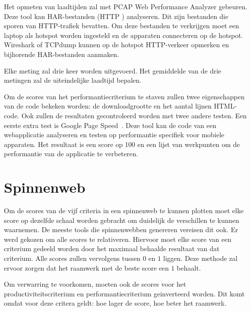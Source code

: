 
Het opmeten van laadtijden zal met PCAP Web Performance Analyzer gebeuren. %
Deze tool kan HAR-bestanden (HTTP ) analyseren.
Dit zijn bestanden die sporen van HTTP-trafiek bevatten.
Om deze bestanden te verkrijgen moet een laptop als hotspot worden ingesteld en de apparaten connecteren op de hotspot.
Wireshark of TCPdump kunnen op de hotspot HTTP-verkeer opmerken en bijhorende HAR-bestanden aanmaken.

Elke meting zal drie keer worden uitgevoerd.
Het gemiddelde van de drie metingen zal de uiteindelijke laadtijd bepalen.

Om de scores van het performantiecriterium te staven zullen twee eigenschappen van de code bekeken worden:  de downloadgrootte en het aantal lijnen HTML-code.
Ook zullen de resultaten gecontroleerd worden met twee andere testen.
Een eerste extra test is Google Page Speed~\cite{Morgan2011}. 
Deze tool kan de code van een webapplicatie analyseren en testen op performantie specifiek voor mobiele apparaten.
Het resultaat is een score op 100 en een lijst van werkpunten om de performantie van de applicatie te verbeteren.


\section{Spinnenweb}
\label{sec:vergelijking-spinnenweb}

Om de scores van de vijf criteria in een spinnenweb te kunnen plotten moet elke score op dezelfde schaal worden gebracht om duidelijk de verschillen te kunnen waarnemen.
De meeste tools die spinnenwebben genereren vereisen dit ook. %
Er werd gekozen om alle scores te relativeren.
Hiervoor moet elke score van een criterium gedeeld worden door het maximaal behaalde resultaat van dat criterium.
Alle scores zullen vervolgens tussen $0$ en $1$ liggen.
Deze methode zal ervoor zorgen dat het raamwerk met de beste score een $1$ behaalt.

Om verwarring te voorkomen, moeten ook de scores voor het productiviteitscriterium en performantiecriterium geinverteerd worden.
Dit komt omdat voor deze critera geldt:  hoe lager de score,  hoe beter het raamwerk.

